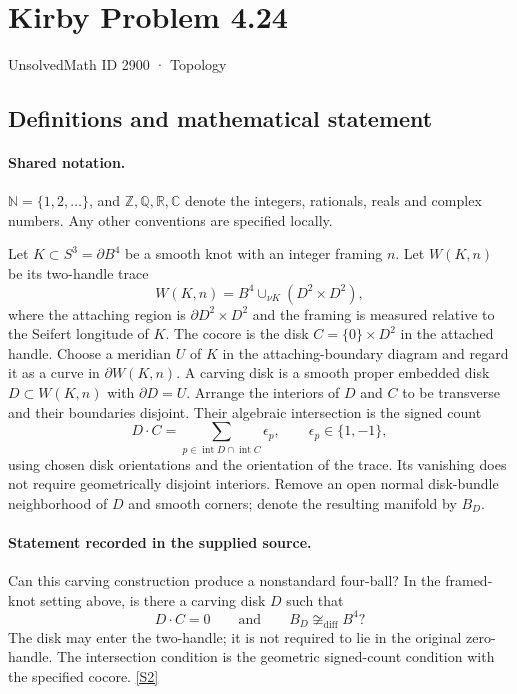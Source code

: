 \documentclass[11pt]{article}
\newcommand{\sref}[2]{\hyperlink{source:#1:#2}{[S#2]}}
\begin{document}
\setcounter{section}{2899}
\section{Kirby Problem 4.24}\label{2900}
{\small\sffamily UnsolvedMath ID 2900 · Topology}
\subsection{Definitions and mathematical statement}

\paragraph{Shared notation.}$\mathbb N=\{1,2,\ldots\}$, and $\mathbb Z,\mathbb Q,\mathbb R,\mathbb C$ denote the integers, rationals, reals and complex numbers. Any other conventions are specified locally.


Let $K\subset S^3=\partial B^4$ be a smooth knot with an integer framing $n$. Let $W(K,n)$ be its two-handle trace
\[
W(K,n)=B^4\cup_{\nu K}(D^2\times D^2),
\]
where the attaching region is $\partial D^2\times D^2$ and the framing is measured relative to the Seifert longitude of $K$. The cocore is the disk $C=\{0\}\times D^2$ in the attached handle. Choose a meridian $U$ of $K$ in the attaching-boundary diagram and regard it as a curve in $\partial W(K,n)$. A carving disk is a smooth proper embedded disk $D\subset W(K,n)$ with $\partial D=U$. Arrange the interiors of $D$ and $C$ to be transverse and their boundaries disjoint. Their algebraic intersection is the signed count
\[
D\cdot C=\sum_{p\in\operatorname{int}D\cap\operatorname{int}C}\epsilon_p,
\qquad\epsilon_p\in\{1,-1\},
\]
using chosen disk orientations and the orientation of the trace. Its vanishing does not require geometrically disjoint interiors. Remove an open normal disk-bundle neighborhood of $D$ and smooth corners; denote the resulting manifold by $B_D$.
\paragraph{Statement recorded in the supplied source.}
Can this carving construction produce a nonstandard four-ball? In the framed-knot setting above, is there a carving disk $D$ such that
\[
D\cdot C=0\qquad\text{and}\qquad B_D\not\cong_{\mathrm{diff}}B^4?
\]
The disk may enter the two-handle; it is not required to lie in the original zero-handle. The intersection condition is the geometric signed-count condition with the specified cocore. \sref{2900}{2}
\end{document}
